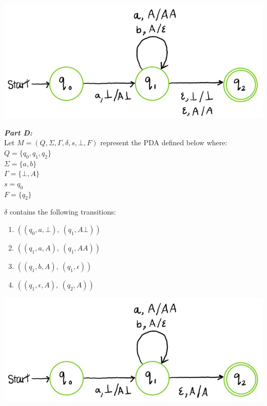 \documentclass[11pt,fleqn]{article}
\newcommand{\be}{\begin{enumerate}}
\newcommand{\ee}{\end{enumerate}}
\newcommand{\set}[1]{{\{ #1 \}}}
\begin{document}
	\begin{center}
	\includegraphics[scale = 0.5]{A8partC.JPG}
	\end{center}

	\noindent\textbf{\emph{Part D:}}\\
	Let $M = (Q, \Sigma, \Gamma, \delta, s, \bot, F)$ represent the PDA defined below where:\\
	$Q = \set{q_0, q_1, q_2}$\\
	$\Sigma = \set{a, b}$\\
	$\Gamma = \set{\bot, A}$\\
	$s = q_0$\\
	$F = \set{q_2}$

	\noindent$\delta$ contains the following transitions:
	\be
	\item $((q_0, a, \bot),\ (q_1, A\bot))$
	\item $((q_1, a, A),\ (q_1, AA))$
	\item $((q_1, b, A),\ (q_1, \epsilon))$
	\item $((q_1, \epsilon, A),\ (q_2, A))$
	\ee
	
	\begin{center}
	\includegraphics[scale = 0.5]{A8partD.JPG}
	\end{center}

	
	
\end{document}
